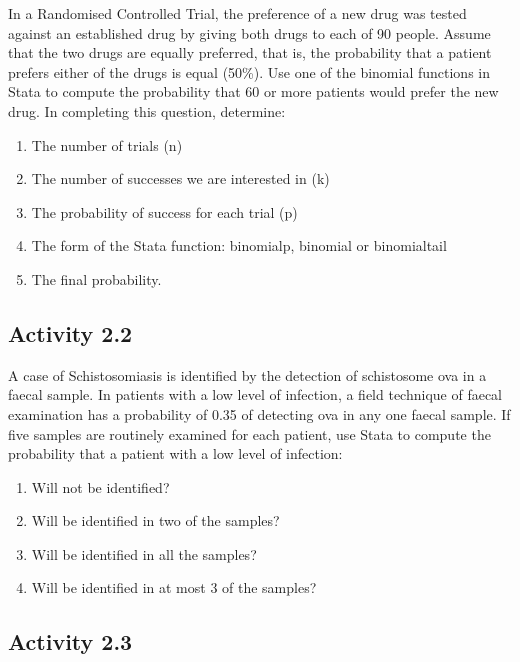 \documentclass[
]{memoir}
\providecommand{\tightlist}{%
  \setlength{\itemsep}{0pt}\setlength{\parskip}{0pt}}
\begin{document}
In a Randomised Controlled Trial, the preference of a new drug was tested against an established drug by giving both drugs to each of 90 people. Assume that the two drugs are equally preferred, that is, the probability that a patient prefers either of the drugs is equal (50\%). Use one of the binomial functions in Stata to compute the probability that 60 or more patients would prefer the new drug. In completing this question, determine:

\begin{enumerate}
\def\labelenumi{\alph{enumi})}
\tightlist
\item
  The number of trials (n)
\item
  The number of successes we are interested in (k)
\item
  The probability of success for each trial (p)
\item
  The form of the Stata function: binomialp, binomial or binomialtail
\item
  The final probability.
\end{enumerate}

\hypertarget{activity-2.2}{%
\subsection*{Activity 2.2}\label{activity-2.2}}

A case of Schistosomiasis is identified by the detection of schistosome ova in a faecal sample. In patients with a low level of infection, a field technique of faecal examination has a probability of 0.35 of detecting ova in any one faecal sample. If five samples are routinely examined for each patient, use Stata to compute the probability that a patient with a low level of infection:

\begin{enumerate}
\def\labelenumi{\alph{enumi})}
\tightlist
\item
  Will not be identified?
\item
  Will be identified in two of the samples?
\item
  Will be identified in all the samples?
\item
  Will be identified in at most 3 of the samples?
\end{enumerate}

\hypertarget{activity-2.3}{%
\subsection*{Activity 2.3}\label{activity-2.3}}
\end{document}
